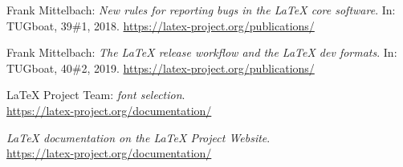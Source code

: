 \documentclass{ltnews}
\begin{document}
\begin{thebibliography}{9}


 Frank Mittelbach:
  \emph{New rules for reporting bugs in the \LaTeX{} core software}.  
  In: TUGboat, 39\#1, 2018.
  \url{https://latex-project.org/publications/}

 Frank Mittelbach:
  \emph{The
  \LaTeX{} release workflow and the \LaTeX{} dev formats}.  
  In: TUGboat, 40\#2, 2019.
  \url{https://latex-project.org/publications/}

 \LaTeX{} Project Team:
  \emph{\LaTeXe{} font selection}.\\  
  \url{https://latex-project.org/documentation/}

  \emph{\LaTeX{} documentation on the \LaTeX{} Project Website}.\\  
  \url{https://latex-project.org/documentation/}


\end{thebibliography}
\end{document}
